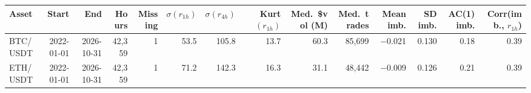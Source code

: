 \begin{tabular}{lrrrrrrrrrrrrr}
\toprule
Asset & Start & End & Hours & Missing & $\sigma(r_{1h})$ & $\sigma(r_{4h})$ & Kurt$(r_{1h})$ & Med.\ \$vol (M) & Med.\ trades & Mean imb. & SD imb. & AC(1) imb. & Corr(imb., $r_{1h}$)\\
\midrule
BTC/USDT & 2022-01-01 & 2026-10-31 & 42,359 & 1 & 53.5 & 105.8 & 13.7 & 60.3 & 85,699 & \ensuremath{-}0.021 & 0.130 & 0.18 & 0.39\\
ETH/USDT & 2022-01-01 & 2026-10-31 & 42,359 & 1 & 71.2 & 142.3 & 16.3 & 31.1 & 48,442 & \ensuremath{-}0.009 & 0.126 & 0.21 & 0.39\\
\bottomrule
\end{tabular}
